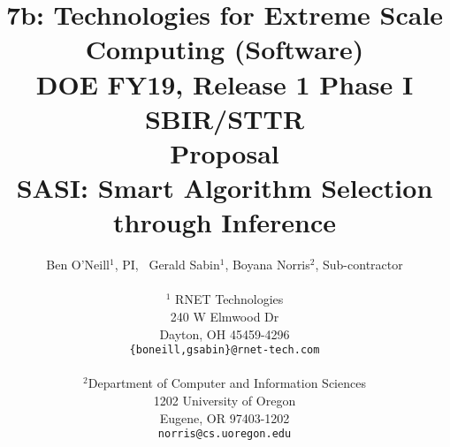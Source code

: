 \title{7b: Technologies for Extreme Scale Computing (Software)\\
DOE FY19, Release 1 Phase I SBIR/STTR \\
\vspace{0.25in}Proposal\\
\vspace{0.25in} SASI: Smart Algorithm Selection through Inference \\
\vspace{0.5in}}
\author{Ben O'Neill$^1$, PI, \ Gerald Sabin$^1$, Boyana Norris$^2$, Sub-contractor\\
  \\$^1$ RNET Technologies\\
  240 W Elmwood Dr\\
  Dayton, OH 45459-4296\\
{\tt \{boneill,gsabin\}@rnet-tech.com}\\\\
$^2$Department of Computer and Information Sciences\\
  1202 University of Oregon\\
  Eugene, OR 97403-1202\\
  {\tt norris@cs.uoregon.edu}
}